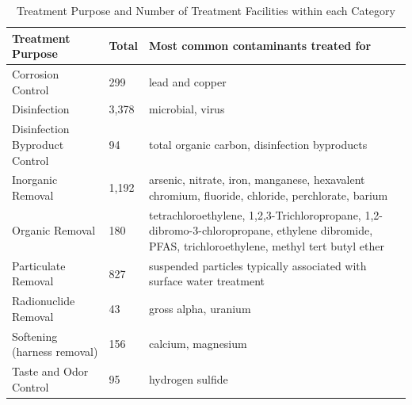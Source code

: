 \begin{table}[]
\begin{tabular}{|l|l|l|}
\hline
Treatment   Purpose                & Total & Most   common   contaminants   treated   for                                                                                                                          \\ \hline
Corrosion   Control                & 299   & lead   and   copper                                                                                                                                                   \\ \hline
Disinfection                       & 3,378 & microbial,   virus                                                                                                                                                    \\ \hline
Disinfection   Byproduct   Control & 94    & total   organic   carbon,   disinfection   byproducts                                                                                                                 \\ \hline
Inorganic Removal                  & 1,192 & arsenic,   nitrate,   iron,   manganese,   hexavalent   chromium,   fluoride,   chloride,   perchlorate,   barium                                                     \\ \hline
Organic   Removal                  & 180   & tetrachloroethylene,   1,2,3-Trichloropropane,   1,2-   dibromo-3-chloropropane,   ethylene   dibromide,   PFAS,   trichloroethylene,   methyl   tert   butyl   ether \\ \hline
Particulate   Removal              & 827   & suspended   particles   typically   associated   with surface   water   treatment                                                                                     \\ \hline
Radionuclide   Removal             & 43    & gross   alpha,   uranium                                                                                                                                              \\ \hline
Softening   (harness   removal)    & 156   & calcium,   magnesium                                                                                                                                                  \\ \hline
Taste   and   Odor   Control       & 95    & hydrogen   sulfide                                                                                                                                                    \\ \hline
\end{tabular}
\caption{Treatment Purpose and Number of Treatment Facilities within each Category}
\end{table}


